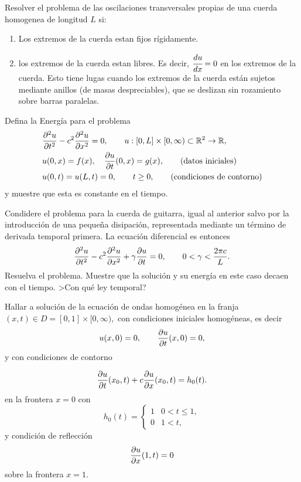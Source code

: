 \documentclass[11pt,spanish]{article}
\newcounter{problema}
\begin{document}
\prob{} Resolver el problema de las oscilaciones transversales propias de una cuerda homogenea de longitud $L$ si:

\begin{enumerate}
\item Los extremos de la cuerda estan fijos r\'igidamente. 

\item los extremos de la cuerda estan libres. Es decir, $\cfrac{du}{dx}=0$ en los extremos de la cuerda. Esto tiene lugas cuando los extremos de la cuerda est\'an sujetos mediante anillos (de masas despreciables), que se deslizan sin rozamiento sobre barras paralelas.


\end{enumerate}
\prob{} Defina la Energía para el problema 
\begin{equation*}\begin{split}
&\frac{\partial ^2u}{\partial t^2} - c^2\frac{\partial ^2u}{\partial x^2} = 0, \qquad u:[0,L]\times[0,\infty)\subset\mathbb{R}^2\to
\mathbb{R},\\
&u(0,x) = f(x),\quad  \frac{\partial u}{\partial t}(0,x) = g(x),\qquad \mbox{(datos iniciales)}\\
&u(0,t) = u(L,t)=  0, \qquad t\ge 0, \qquad \mbox{(condiciones de contorno)}
\end{split}
\end{equation*}
y muestre que esta es constante en el tiempo.

\prob{} Condidere el problema para la cuerda de guitarra, igual al anterior
salvo por la introducción de una pequeña disipación, representada mediante un término de derivada temporal primera. La ecuación diferencial es entonces
\[
\frac{\partial ^2u}{\partial t^2} - c^2\frac{\partial ^2u}{\partial x^2} + \gamma \frac{\partial u}{\partial t} = 0, \qquad 0 < \gamma <
\frac{2\pi c}{L}.
\]
Resuelva el problema. Muestre que la solución y su energía en este caso decaen
con el tiempo. >Con qué ley temporal?

\prob{} Hallar a solución de la ecuación de ondas homogénea en la franja
$(x,t) \in D = [0,1]\times [0,\infty),$ con condiciones iniciales homogéneas, es
decir
\[
u(x,0) = 0, \qquad \frac{\partial u}{\partial t}(x,0) = 0,
\]
y con condiciones de contorno 

\begin{equation}\label{bc_frontera_izq}
\frac{\partial u}{\partial t}(x_0,t) + c\frac{\partial u}{\partial x}(x_0,t) = h_0(t).
\end{equation}
en la frontera $x=0$ con
\[
h_0(t) = \begin{cases}
1 &  0<t\le 1,\\
0 &  1<t,
\end{cases}
\]
y condición de reflección 
\[
\frac{\partial u}{\partial x}(1,t) = 0
\]
sobre la frontera $x=1.$
\end{document}

